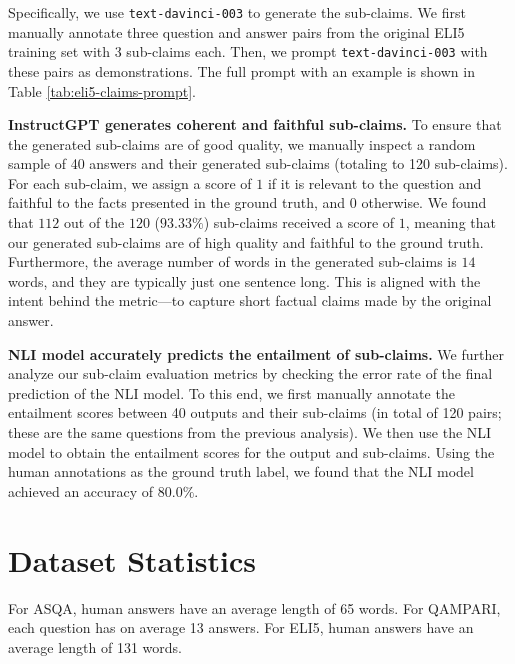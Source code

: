 \documentclass[11pt]{article}
\newcommand\ttt[1]{\texttt{#1}}
\renewcommand{\paragraph}[1]{\vspace{0.2cm}\noindent\textbf{#1}}
\begin{document}
Specifically, we use \ttt{text-davinci-003}  to generate the sub-claims.
We first manually annotate three question and answer pairs from the original ELI5 training set with 3 sub-claims each.
Then, we prompt \ttt{text-davinci-003} with these pairs as demonstrations.
The full prompt with an example is shown in Table \ref{tab:eli5-claims-prompt}.

\paragraph{InstructGPT generates coherent and faithful sub-claims.}
To ensure that the generated sub-claims are of good quality, we manually inspect a random sample of 40 answers and their generated sub-claims (totaling to 120 sub-claims).
For each sub-claim, we assign a score of $1$ if it is relevant to the question and faithful to the facts presented in the ground truth, and $0$ otherwise.
We found that $112$ out of the $120$ ($93.33\%$) sub-claims received a score of $1$, meaning that our generated sub-claims are of high quality and faithful to the ground truth.
Furthermore, the average number of words in the generated sub-claims is $14$ words, and they are typically just one sentence long.
This is aligned with  the intent behind the metric---to capture short factual claims made by the original answer.

\paragraph{NLI model accurately predicts the entailment of sub-claims.}
We further analyze our sub-claim evaluation metrics by checking the error rate of the final prediction of the NLI model.
To this end, we first manually annotate the entailment scores between 40 outputs and their sub-claims (in total of 120 pairs; these are the same questions from the previous analysis). 
We then use the NLI model to obtain the entailment scores for the output and sub-claims. 
Using the human annotations as the ground truth label, we found that the NLI model achieved an accuracy of $80.0\%$. 


\section{Dataset Statistics}

\label{app_sec:dataset_stats}

For ASQA, human answers have an average length of 65 words.
For QAMPARI, each question has on average 13 answers. 
For ELI5, human answers have an average length of 131 words.
\end{document}
